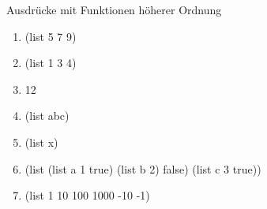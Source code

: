 \documentclass{../preamble}
\begin{document}
\begin{task}[credit = \stars{1}{3}]{Ausdrücke mit Funktionen höherer Ordnung}
    \begin{solution}
        \begin{enumerate}
            \item (\textcolor{keywordcolor}{list} 5 7 9)
            \item (\textcolor{keywordcolor}{list} 1 3 4)
            \item 12
            \item (\textcolor{keywordcolor}{list} \grqq{} \grqq abc\grqq)
            \item (\textcolor{keywordcolor}{list} \grqq x\grqq)
            \item (\textcolor{keywordcolor}{list} (\textcolor{keywordcolor}{list} \grqq a\grqq{} 1 \textcolor{keywordcolor}{true}) (\textcolor{keywordcolor}{list} \grqq b\grqq{} 2)
                  \textcolor{keywordcolor}{false}) (\textcolor{keywordcolor}{list} \grqq c\grqq{} 3 \textcolor{keywordcolor}{true}))
            \item (\textcolor{keywordcolor}{list} 1 10 100 1000 -10 -1)
        \end{enumerate}
    \end{solution}
\end{task}

\clearpage
\end{document}
